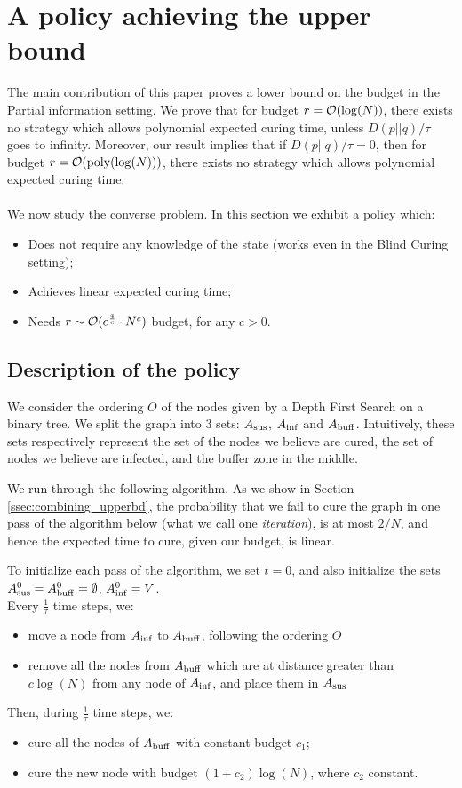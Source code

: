 \section{A policy achieving the upper bound} \label{sec:upperBound}
The main contribution of this paper proves a lower bound on the budget in the Partial information setting. We prove that for budget $r = \mathcal{O}(\log(N))$, there exists no strategy which allows polynomial expected curing time, unless $D(p||q)/\tau$ goes to infinity. Moreover, our result implies that if $D(p||q)/\tau = 0$, then for budget $r = \mathcal{O}({\rm poly}(\log(N)))$, there exists no strategy which allows polynomial expected curing time. \\\\
We now study the converse problem. In this section we exhibit a policy which:
\begin{itemize}
	\item Does not require any knowledge of the state (works even in the Blind Curing setting);
	\item Achieves linear expected curing time;
	\item Needs $r \sim \mathcal{O}(e^{\frac{4}{c}} \cdot N^c)$ budget, for any $c>0$.
\end{itemize}

\subsection{Description of the policy}
We consider the ordering $O$ of the nodes given by a Depth First Search on a binary tree. We split the graph into 3 sets: $A_{{\rm sus}}$, $A_{{\rm inf}}$ and $A_{{\rm buff}}$. Intuitively, these sets respectively represent the set of the nodes we believe are cured, the set of nodes we believe are infected, and the buffer zone in the middle. 

We run through the following algorithm. As we show in Section \ref{ssec:combining_upperbd}, the probability that we fail to cure the graph in one pass of the algorithm below (what we call one {\em iteration}), is at most $2/N$, and hence the expected time to cure, given our budget, is linear. 

To initialize each pass of the algorithm, we set $t=0$, and also initialize the sets $A_{{\rm sus}}^0 = A_{{\rm buff}}^0 = \emptyset$, $A_{{\rm inf}}^0 = V$.\\
Every $\frac{1}{\tau}$ time steps, we:
\begin{itemize}
	\item move a node from $A_{{\rm inf}}$ to $A_{{\rm buff}}$, following the ordering $O$
	\item remove all the nodes from $A_{{\rm buff}}$ which are at distance greater than $c\log(N)$ from any node of $A_{{\rm inf}}$, and place them in $A_{{\rm sus}}$
\end{itemize}
Then, during $\frac{1}{\tau}$ time steps, we:
\begin{itemize}
	\item cure all the nodes of $A_{{\rm buff}}$ with constant budget $c_1$;
	\item cure the new node with budget $(1 + c_2) \log(N)$, where $c_2$ constant.
\end{itemize}

